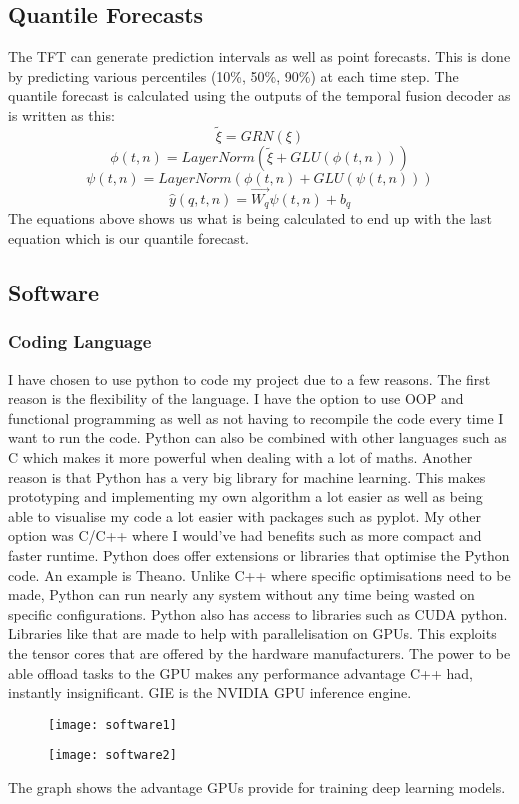 \documentclass{article}
\begin{document}
\subsection{Quantile Forecasts}
The TFT can generate prediction intervals as well as point forecasts. This is done by predicting various percentiles (10\%, 50\%, 90\%) at each time step. The quantile forecast is calculated using the outputs of the temporal fusion decoder as is written as this:
$$\tilde{\xi} = GRN(\xi)$$
$$\phi(t,n)=LayerNorm(\tilde{\xi}+ GLU(\phi(t,n)))$$
$$\psi(t,n)= LayerNorm(\phi(t,n)+GLU(\psi(t,n)))$$
$$\hat{y}(q,t,n)=\vec{W_q}\psi(t,n)+b_q$$
The equations above shows us what is being calculated to end up with the last equation which is our quantile forecast.


\subsection{Software}

\subsubsection{Coding Language}
I have chosen to use python to code my project due to a few reasons. The first reason is the flexibility of the language. I have the option to use OOP and functional programming as well as not having to recompile the code every time I want to run the code. Python can also be combined with other languages such as C which makes it more powerful when dealing with a lot of maths.
Another reason is that Python has a very big library for machine learning. This makes prototyping and implementing my own algorithm a lot easier as well as being able to visualise my code a lot easier with packages such as pyplot.
My other option was C/C++ where I would’ve had benefits such as more compact and faster runtime. Python does offer extensions or libraries that optimise the Python code. An example is Theano. Unlike C++ where specific optimisations need to be made, Python can run nearly any system without any time being wasted on specific configurations. Python also has access to libraries such as CUDA python. Libraries like that are made to help with parallelisation on GPUs. This exploits the tensor cores that are offered by the hardware manufacturers. The power to be able offload tasks to the GPU makes any performance advantage C++ had, instantly insignificant.
GIE is the NVIDIA GPU inference engine.
\begin{figure}
    \centering
    \texttt{[image: software1]}
    \caption{}
\end{figure}
\begin{figure}
    \centering
    \texttt{[image: software2]}
    \caption{}
\end{figure}
The graph shows the advantage GPUs provide for training deep learning models.
\end{document}
